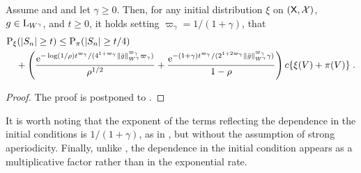 \documentclass[sn-mathphys,Numbered]{sn-jnl}%
\begin{document}
\begin{theorem}
  \label{theo:prob_ineq_V_norm}
  Assume  and  and let $\gamma \geq 0$. Then, for any initial distribution $\xi$ on $(\mathsf{X},\mathcal{X})$, $g \in \mathrm{L}_{W^\gamma}$, and $t \geq 0$, it holds setting  $\varpi_{\gamma} = 1/(1+\gamma)$, that
  \begin{align*}
&\mathrm{P}_{\xi}(|S_n| \geq t) \leq    \mathrm{P}_{\pi}(|S_n| \geq t/4) \\
    & \quad + \left( \frac{\mathrm{e}^{-\log(1/\rho)t^{\varpi_{\gamma}}/(4^{1+\varpi_{\gamma}}\|\bar{g}\|_{W^\gamma}^{\varpi_{\gamma}}\varpi_{\gamma})}}{\rho^{1/2}} +   \frac{\mathrm{e}^{-(1+\gamma) t^{\varpi_{\gamma}}/(2^{1+2\varpi_{\gamma}}\|\bar{g}\|_{W^\gamma}^{\varpi_{\gamma}}\gamma)}}{1-\rho} \right)c \{ \xi(V) + \pi(V) \}\;.
  \end{align*}
\end{theorem}
\begin{proof}
  The proof is postponed to .
\end{proof}
It is worth noting that the exponent of the terms reflecting the dependence in the initial conditions is $1/(1+\gamma)$, as in \cite[Theorem~5.1]{adamczak2015exponential}, but without the assumption of strong aperiodicity. Finally, unlike \cite[Theorem~5.1]{adamczak2015exponential}, the dependence in the initial condition appears as a multiplicative factor rather than in the exponential rate.
\end{document}

